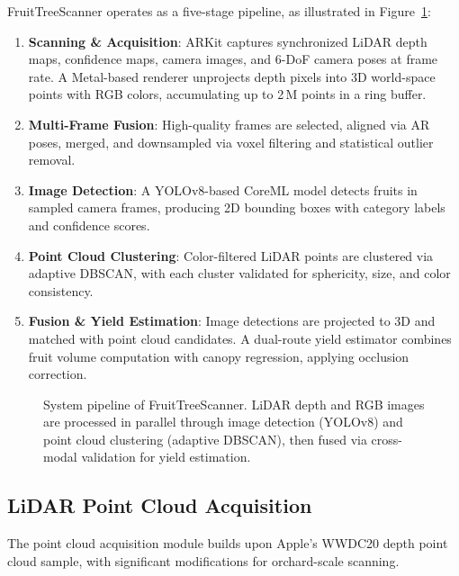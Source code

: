 \documentclass[article,final]{iclr2024_conference}
\newcommand{\theMethod}{FruitTreeScanner}
\begin{document}
\theMethod{} operates as a five-stage pipeline, as illustrated in Figure~\ref{fig:pipeline}:

\begin{enumerate}[leftmargin=*,nosep]
    \item \textbf{Scanning \& Acquisition}: ARKit captures synchronized LiDAR depth maps, confidence maps, camera images, and 6-DoF camera poses at frame rate. A Metal-based renderer unprojects depth pixels into 3D world-space points with RGB colors, accumulating up to 2\,M points in a ring buffer.
    \item \textbf{Multi-Frame Fusion}: High-quality frames are selected, aligned via AR poses, merged, and downsampled via voxel filtering and statistical outlier removal.
    \item \textbf{Image Detection}: A YOLOv8-based CoreML model detects fruits in sampled camera frames, producing 2D bounding boxes with category labels and confidence scores.
    \item \textbf{Point Cloud Clustering}: Color-filtered LiDAR points are clustered via adaptive DBSCAN, with each cluster validated for sphericity, size, and color consistency.
    \item \textbf{Fusion \& Yield Estimation}: Image detections are projected to 3D and matched with point cloud candidates. A dual-route yield estimator combines fruit volume computation with canopy regression, applying occlusion correction.
\end{enumerate}

\begin{figure}[t]
\centering
{}
\caption{System pipeline of \theMethod{}. LiDAR depth and RGB images are processed in parallel through image detection (YOLOv8) and point cloud clustering (adaptive DBSCAN), then fused via cross-modal validation for yield estimation.}
\label{fig:pipeline}
\end{figure}

\subsection{LiDAR Point Cloud Acquisition}
\label{sec:acquisition}

The point cloud acquisition module builds upon Apple's WWDC20 depth point cloud sample, with significant modifications for orchard-scale scanning.
\end{document}
